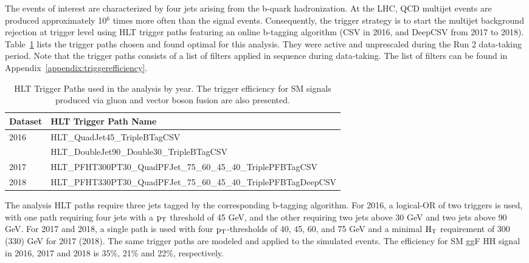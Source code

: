 The events of interest are characterized by four jets arising from the b-quark hadronization. At the LHC, QCD multijet events are produced approximately 10$^6$ times more often than the signal events. Consequently, the trigger strategy is to start the multijet background rejection at trigger level using HLT trigger paths featuring an online b-tagging algorithm (CSV in 2016, and DeepCSV from 2017 to 2018). Table~\ref{trigger:tab:paths} lists the trigger paths chosen and found optimal for this analysis. They were active and unprescaled during the Run 2 data-taking period. Note that the trigger paths consists of a list of filters applied in sequence during data-taking. The list of filters can be found in Appendix~\ref{appendix:triggerefficiency}. 
\begin{table}[htb]
\centering
\caption[HLT Trigger Paths used in the analysis by year]{\label{trigger:tab:paths} HLT Trigger Paths used in the analysis by year. The trigger efficiency for SM signals produced via gluon and vector boson fusion are also presented.}
\begin{tabularx}{\textwidth}{lX}
\hline
Dataset                & HLT Trigger Path Name\\
\hline
2016                   & HLT\_QuadJet45\_TripleBTagCSV   \\  
                   & HLT\_DoubleJet90\_Double30\_TripleBTagCSV  \\                 
2017                   & HLT\_PFHT300PT30\_QuadPFJet\_75\_60\_45\_40\_TriplePFBTagCSV \\ 
2018                   & HLT\_PFHT330PT30\_QuadPFJet\_75\_60\_45\_40\_TriplePFBTagDeepCSV \\ 
\hline
\end{tabularx}
\end{table}
The analysis HLT paths require three jets tagged by the corresponding b-tagging algorithm. For 2016, a logical-OR of two triggers is used, with one path requiring four jets with a $\mathrm{p_{T}}$ threshold of 45 GeV, and the other requiring two jets above 30 GeV and two jets above 90 GeV. For 2017 and 2018, a single path is used with four $\mathrm{p_{T}}$-thresholds of 40, 45, 60, and 75 GeV and a minimal $\mathrm{H_{T}}$ requirement of 300 (330) GeV for 2017 (2018). The same trigger paths are modeled and applied to the simulated events. The efficiency for SM ggF HH signal in 2016, 2017 and 2018 is 35\%, 21\% and 22\%, respectively.

